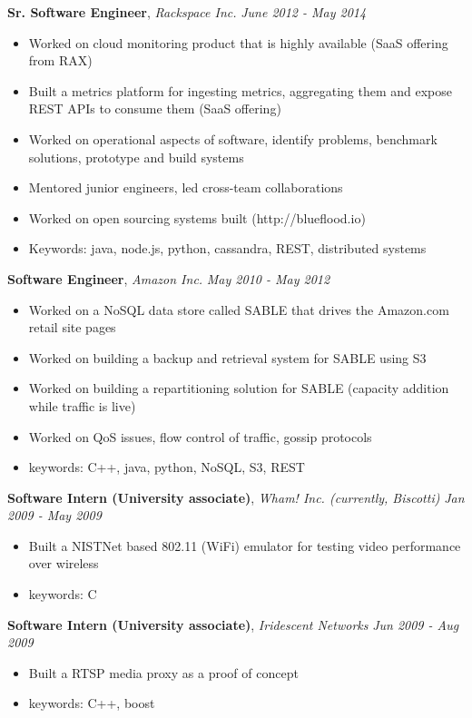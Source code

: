 \documentclass[9pt]{article}
\newenvironment{changemargin}[2]{%
  \begin{list}{}{%
    \setlength{\topsep}{0pt}%
    \setlength{\leftmargin}{#1}%
    \setlength{\rightmargin}{#2}%
    \setlength{\listparindent}{\parindent}%
    \setlength{\itemindent}{\parindent}%
    \setlength{\parsep}{\parskip}%
  }%
  \item[]}{\end{list}
}
\newenvironment{body} {
	\vspace*{-16pt}
	\begin{changemargin}{-0.25in}{-0.5in}
  }
	{\end{changemargin}
}
\begin{document}
\begin{body}
    \textbf{Sr. Software Engineer}, \emph{Rackspace Inc.} \hfill \emph{June 2012 - May 2014}\\
    \begin{itemize} \itemsep -0pt  %
    \item Worked on cloud monitoring product that is highly available (SaaS offering from RAX)
    \item Built a metrics platform for ingesting metrics, aggregating them and expose REST APIs to consume them (SaaS offering)
    \item Worked on operational aspects of software, identify problems, benchmark solutions, prototype and build systems
    \item Mentored junior engineers, led cross-team collaborations
    \item Worked on open sourcing systems built (http://blueflood.io)
    \item Keywords: java, node.js, python, cassandra, REST, distributed systems
    \end{itemize}

	\textbf {Software Engineer}, \emph{Amazon Inc.} \hfill \emph{May 2010 - May 2012}\\
	\begin{itemize} \itemsep -0pt
		\item Worked on a NoSQL data store called SABLE that drives the Amazon.com retail site pages
    \item Worked on building a backup and retrieval system for SABLE using S3
    \item Worked on building a repartitioning solution for SABLE (capacity addition while traffic is live)
    \item Worked on QoS issues, flow control of traffic, gossip protocols
    \item keywords: C++, java, python, NoSQL, S3, REST
	\end{itemize}

  \textbf {Software Intern (University associate)}, \emph{Wham! Inc. (currently, Biscotti)} \hfill \emph{Jan 2009 - May 2009}\\
	\begin{itemize} \itemsep -0pt
    \item Built a NISTNet based 802.11 (WiFi) emulator for testing video performance over wireless
    \item keywords: C
	\end{itemize}

  \textbf {Software Intern (University associate)}, \emph{Iridescent Networks} \hfill \emph{Jun 2009 - Aug 2009}\\
	\begin{itemize} \itemsep -0pt
    \item Built a RTSP media proxy as a proof of concept
    \item keywords: C++, boost
	\end{itemize}


\end{body}
\end{document}

